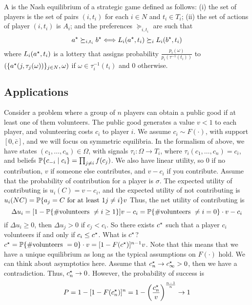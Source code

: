 \documentclass[10pt]{article}
\begin{document}
\begin{definition}
	A  is the Nash equilibrium of a strategic game defined as follows: (i) the set of players is the set of pairs $(i,t_i)$ for each $i \in N$ and $t_i \in T_i$; (ii) the set of actions of player $(i,t_i)$ is $A_i$; and the preferences $\succeq_{i,t_i}$ are such that \[a^\star \succeq_{i,t_i} b^\star \Longleftrightarrow L_i(a^\star,t_i) \succeq_i L_i(b^\star,t_i)\]where $L_i(a^\star,t_i)$ is a lottery that assigns probability $\frac{p_i(\omega)}{p_i(\tau^{-1}(t_i))}$ to $\left( \{a^\star(j,\tau_j(\omega))\}_{j\in N},\omega\right)$ if $\omega \in \tau_i^{-1}(t_i)$ and 0 otherwise.
\end{definition}

\subsection{Applications}

\begin{example}
	 Consider a problem where a group of $n$ players can obtain a public good if at least one of them volunteers. The public good generates a value $v < 1$ to each player, and volunteering costs $c_i$ to player $i$. We assume $c_i \sim F(\cdot)$, with support $[0,\bar{c}]$, and we will focus on symmetric equilibria. In the formalism of above, we have states $(c_1,\dots,c_n) \in \Omega$, with signals $\tau_i : \Omega \to T_i$, where $\tau_i(c_1,\dots,c_n) = c_i$, and beliefs $\mathbb{P}\{c_{-i} \mid c_i\} = \prod_{j \ne i} f(c_j)$. We also have linear utility, so $0$ if no contribution, $v$ if someone else contributes, and $v-c_i$ if you contribute. Assume that the probability of contribution for a player is $\sigma$. The expected utility of contributing is $u_i(C) = v - c_i$, and the expected utility of not contributing is $u_i(NC) = \mathbb{P}\{a_j = C \text{ for at least } 1 j \ne i\} v$ Thus, the net utility of contributing is \[\Delta u_i = [1-\mathbb{P}\{\# \text{volunteers } \ne i \ge 1\}] v - c_i = \mathbb{P}\{\# \text{volunteers } \ne i = 0\}\cdot v - c_i\]if $\Delta u_i \ge 0$, then $\Delta u_j > 0$ if $c_j < c_i$. So there exists $c^\star$ such that a player $c_i$ volunteers if and only if $c_i \le c^\star$. What is $c^\star$? $c^\star = \mathbb{P}\{\# \text{volunteers } = 0\}\cdot v = [1-F(c^\star)]^{n-1}v$. Note that this means that we have a unique equilibrium as long as the typical assumptions on $F(\cdot)$ hold. We can think about asymptotics here. Assume that $c_n^\star \to c^\star_\infty > 0$, then we have a contradiction. Thus, $c_n^\star \to 0$. However, the probability of success is \[P = 1-[1-F(c_n^\star)]^n = 1-\left( \frac{c_n^\star}{v}\right)^{\frac{n-1}{n}} \to 1\]
\end{example}
\end{document}
